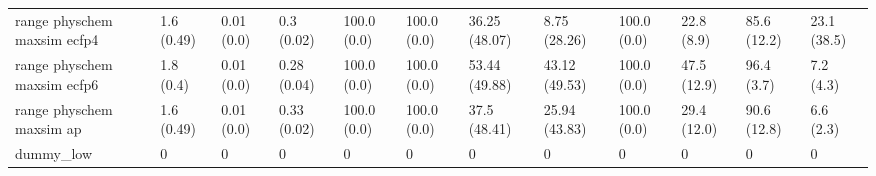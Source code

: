 \begin{tabular}{llllllllllll}
range physchem maxsim ecfp4 & {\cellcolor[HTML]{F5FBFC}} \color[HTML]{000000} 1.6 (0.49) & {\cellcolor[HTML]{F6FCFD}} \color[HTML]{000000} 0.01 (0.0) & {\cellcolor[HTML]{B7E4DA}} \color[HTML]{000000} 0.3 (0.02) & {\cellcolor[HTML]{00441B}} \color[HTML]{F1F1F1} 100.0 (0.0) & {\cellcolor[HTML]{00441B}} \color[HTML]{F1F1F1} 100.0 (0.0) & {\cellcolor[HTML]{9FDACC}} \color[HTML]{000000} 36.25 (48.07) & {\cellcolor[HTML]{EBF7FA}} \color[HTML]{000000} 8.75 (28.26) & {\cellcolor[HTML]{00441B}} \color[HTML]{F1F1F1} 100.0 (0.0) & {\cellcolor[HTML]{D1EEE9}} \color[HTML]{000000} 22.8 (8.9) & {\cellcolor[HTML]{05712F}} \color[HTML]{F1F1F1} 85.6 (12.2) & {\cellcolor[HTML]{D0EDE9}} \color[HTML]{000000} 23.1 (38.5) \\
range physchem maxsim ecfp6 & {\cellcolor[HTML]{F5FBFC}} \color[HTML]{000000} 1.8 (0.4) & {\cellcolor[HTML]{F6FCFD}} \color[HTML]{000000} 0.01 (0.0) & {\cellcolor[HTML]{C0E7DF}} \color[HTML]{000000} 0.28 (0.04) & {\cellcolor[HTML]{00441B}} \color[HTML]{F1F1F1} 100.0 (0.0) & {\cellcolor[HTML]{00441B}} \color[HTML]{F1F1F1} 100.0 (0.0) & {\cellcolor[HTML]{5CBD98}} \color[HTML]{F1F1F1} 53.44 (49.88) & {\cellcolor[HTML]{82CEB8}} \color[HTML]{000000} 43.12 (49.53) & {\cellcolor[HTML]{00441B}} \color[HTML]{F1F1F1} 100.0 (0.0) & {\cellcolor[HTML]{70C6AC}} \color[HTML]{000000} 47.5 (12.9) & {\cellcolor[HTML]{005020}} \color[HTML]{F1F1F1} 96.4 (3.7) & {\cellcolor[HTML]{EDF8FB}} \color[HTML]{000000} 7.2 (4.3) \\
range physchem maxsim ap & {\cellcolor[HTML]{F4FBFC}} \color[HTML]{000000} 1.6 (0.49) & {\cellcolor[HTML]{F7FCFD}} \color[HTML]{000000} 0.01 (0.0) & {\cellcolor[HTML]{AADFD3}} \color[HTML]{000000} 0.33 (0.02) & {\cellcolor[HTML]{00441B}} \color[HTML]{F1F1F1} 100.0 (0.0) & {\cellcolor[HTML]{00441B}} \color[HTML]{F1F1F1} 100.0 (0.0) & {\cellcolor[HTML]{98D8C9}} \color[HTML]{000000} 37.5 (48.41) & {\cellcolor[HTML]{C8EBE4}} \color[HTML]{000000} 25.94 (43.83) & {\cellcolor[HTML]{00441B}} \color[HTML]{F1F1F1} 100.0 (0.0) & {\cellcolor[HTML]{BAE5DC}} \color[HTML]{000000} 29.4 (12.0) & {\cellcolor[HTML]{006227}} \color[HTML]{F1F1F1} 90.6 (12.8) & {\cellcolor[HTML]{EEF8FB}} \color[HTML]{000000} 6.6 (2.3) \\
dummy_low & {\cellcolor[HTML]{F7FCFD}} \color[HTML]{000000} 0 & {\cellcolor[HTML]{F7FCFD}} \color[HTML]{000000} 0 & {\cellcolor[HTML]{F7FCFD}} \color[HTML]{000000} 0 & {\cellcolor[HTML]{F7FCFD}} \color[HTML]{000000} 0 & {\cellcolor[HTML]{F7FCFD}} \color[HTML]{000000} 0 & {\cellcolor[HTML]{F7FCFD}} \color[HTML]{000000} 0 & {\cellcolor[HTML]{F7FCFD}} \color[HTML]{000000} 0 & {\cellcolor[HTML]{F7FCFD}} \color[HTML]{000000} 0 & {\cellcolor[HTML]{F7FCFD}} \color[HTML]{000000} 0 & {\cellcolor[HTML]{F7FCFD}} \color[HTML]{000000} 0 & {\cellcolor[HTML]{F7FCFD}} \color[HTML]{000000} 0 \\

\end{tabular}
